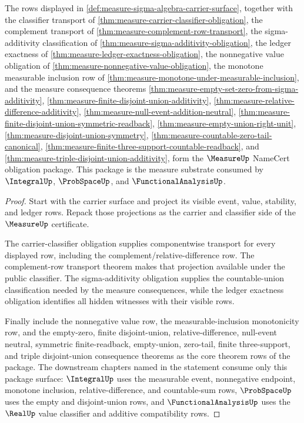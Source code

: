 \begin{theorem}
\label{thm:measure-namecert-obligation-package}
The rows displayed in
\autoref{def:measure-sigma-algebra-carrier-surface}, together with the
classifier transport of
\autoref{thm:measure-carrier-classifier-obligation}, the complement transport
of \autoref{thm:measure-complement-row-transport}, the sigma-additivity
classification of \autoref{thm:measure-sigma-additivity-obligation}, the
ledger exactness of \autoref{thm:measure-ledger-exactness-obligation}, the
nonnegative value obligation of
\autoref{thm:measure-nonnegative-value-obligation}, the monotone measurable
inclusion row of \autoref{thm:measure-monotone-under-measurable-inclusion}, and
the measure consequence theorems
\autoref{thm:measure-empty-set-zero-from-sigma-additivity},
\autoref{thm:measure-finite-disjoint-union-additivity},
\autoref{thm:measure-relative-difference-additivity},
\autoref{thm:measure-null-event-addition-neutral},
\autoref{thm:measure-finite-disjoint-union-symmetric-readback},
\autoref{thm:measure-empty-union-right-unit},
\autoref{thm:measure-disjoint-union-symmetry},
\autoref{thm:measure-countable-zero-tail-canonical},
\autoref{thm:measure-finite-three-support-countable-readback}, and
\autoref{thm:measure-triple-disjoint-union-additivity}, form the
$\MeasureUp$ NameCert obligation package. This package is the measure substrate
consumed by $\IntegralUp$, $\ProbSpaceUp$, and $\FunctionalAnalysisUp$.
\end{theorem}
\begin{proof}
Start with the carrier surface and project its visible event, value, stability,
and ledger rows. Repack those projections as the carrier and classifier side of
the $\MeasureUp$ certificate.

The carrier-classifier obligation supplies componentwise transport for every
displayed row, including the complement/relative-difference row. The
complement-row transport theorem makes that projection available under the
public classifier. The sigma-additivity obligation supplies the countable-union
classification needed by the measure consequences, while the ledger exactness
obligation identifies all hidden witnesses with their visible rows.

Finally include the nonnegative value row, the measurable-inclusion
monotonicity row, and the empty-zero, finite disjoint-union,
relative-difference, null-event neutral, symmetric finite-readback,
empty-union, zero-tail, finite three-support, and triple disjoint-union
consequence theorems as the core theorem rows of the package. The downstream
chapters named in the statement consume only this package surface:
$\IntegralUp$ uses the measurable event, nonnegative endpoint, monotone
inclusion, relative-difference, and countable-sum rows, $\ProbSpaceUp$ uses
the empty and disjoint-union rows, and $\FunctionalAnalysisUp$ uses the
$\RealUp$ value classifier and additive compatibility rows.
\end{proof}

